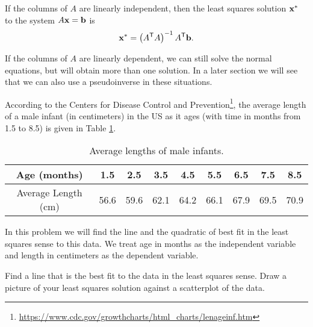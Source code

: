\begin{theorem} \label{thm:6_f_least_squares_2} If the columns of $A$ are linearly independent, then the least squares solution $\mathbf{x}^*$ to the system $A \mathbf{x} = \mathbf{b}$ is
\[\mathbf{x}^* = \left(A^{\mathsf{T}}A\right)^{-1}A^{\mathsf{T}}\mathbf{b}.\]
\end{theorem}

If the columns of $A$ are linearly dependent, we can still solve the normal equations, but will obtain more than one solution. In a later section we will see that we can also use a pseudoinverse in these situations. 


\ExampleIntro

\begin{example} According to the Centers for Disease Control and Prevention\footnote{ \url{https://www.cdc.gov/growthcharts/html_charts/lenageinf.htm}}, the average length of a male infant (in centimeters) in the US as it ages (with time in months from 1.5 to 8.5) is given in Table \ref{T:lengths}. 
\begin{table}[h]
\begin{center}
\begin{tabular}{|c||c|c|c|c|c|c|c|c|} \hline
Age (months)	&1.5	&2.5	&3.5	&4.5	&5.5	&6.5	&7.5	&8.5 \\ \hline
Average Length (cm)	&56.6&59.6&62.1&64.2&66.1&67.9&69.5&70.9 \\ \hline
\end{tabular}
\caption{Average lengths of male infants.}
\label{T:lengths}
\end{center}
\end{table}
In this problem we will find the line and the quadratic of best fit in the least squares sense to this data. We treat age in months as the independent variable and length in centimeters as the dependent variable. 
	\ba
	\item Find a line that is the best fit to the data in the least squares sense. Draw a picture of your least squares solution against a scatterplot of the data. 




\end{example}
